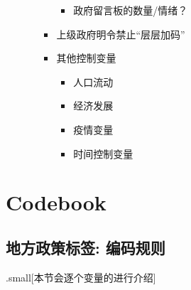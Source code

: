 \documentclass[
  12pt,
]{ctexart}
\providecommand{\tightlist}{%
  \setlength{\itemsep}{0pt}\setlength{\parskip}{0pt}}
\begin{document}
\begin{itemize}
\begin{itemize}
\begin{itemize}
      \begin{itemize}
      \tightlist
      \item
        政府留言板的数量/情绪？
      \end{itemize}
    \item
      上级政府明令禁止``层层加码''
    \item
      其他控制变量

      \begin{itemize}
      \tightlist
      \item
        人口流动
      \item
        经济发展
      \item
        疫情变量
      \item
        时间控制变量
      \end{itemize}
    \end{itemize}
  \end{itemize}
\end{itemize}

\hypertarget{codebook}{%
\section{Codebook}\label{codebook}}

\hypertarget{ux5730ux65b9ux653fux7b56ux6807ux7b7e-ux7f16ux7801ux89c4ux5219}{%
\subsection{地方政策标签: 编码规则}\label{ux5730ux65b9ux653fux7b56ux6807ux7b7e-ux7f16ux7801ux89c4ux5219}}

.small{[}本节会逐个变量的进行介绍{]}
\end{document}
